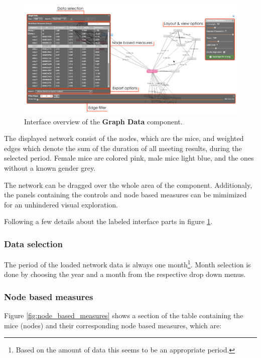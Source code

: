 \begin{figure}[!htpb]
\begin{center}
  \includegraphics[width=\textwidth]{assets/pdf/graph_data_interface_overview.pdf}
  \caption[Graph Data interface overview]{Interface overview of the \textbf{Graph Data} component.}
  \label{fig:graph_data_interface_overview}
\end{center}
\end{figure}

The displayed network consist of the nodes, which are the mice, and weighted edges which denote the sum of the duration of all meeting results, during the selected period. Female mice are colored pink, male mice light blue, and the ones without a known gender grey. 

The network can be dragged over the whole area of the component. Additionaly, the panels containing the controls and node based measures can be mimimized for an unhindered visual exploration.

Following a few details about the labeled interface parts in figure \ref{fig:graph_data_interface_overview}.

\subsubsection*{Data selection}
The period of the loaded network data is always one month\footnote{Based on the amount of data this seems to be an appropriate period.}. Month selection is done by choosing the year and a month from the respective drop down menus.  

\subsubsection*{Node based measures}

Figure \ref{fig:node_based_measures} shows a section of the table containing the mice (nodes) and their corresponding node based measures, which are:

